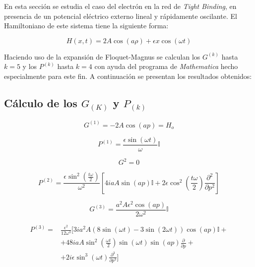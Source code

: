 En esta sección se estudia el caso del electrón en la red de \textit{Tight Binding}, en presencia de un potencial eléctrico externo lineal y rápidamente oscilante. El Hamiltoniano de este sistema tiene la siguiente forma:

\begin{equation}\label{eq:10.10}
    H(x,t)=2A\cos(a\rho)+\epsilon x \cos(\omega t)
\end{equation}

Haciendo uso de la expansión de Floquet-Magnus se calculan los $G^{(k)}$ hasta $k=5$ y los $P^{(k)}$ hasta $k=4$ con ayuda del programa de \textit{Mathematica} hecho especialmente para este fin. A continuación se presentan los resultados obtenidos:

\subsection{Cálculo de los $G_{(K)}$ y $P_{(k)}$}

\begin{equation}\label{eq:10.11}
    G^{(1)}=-2A\cos(ap)=H_o
\end{equation}

\begin{equation}\label{eq:10.12}
    P^{(1)}=\frac{\epsilon\sin(\omega t)}{\omega}\mathbb{I}
\end{equation}

\begin{equation}\label{eq:10.13}
    G^{2}=0
\end{equation}

\begin{equation}\label{eq:10.14}
    P^{(2)}=\frac{\epsilon\sin^2(\frac{t\omega}{2})}{\omega^2}[4iaA\sin(ap)\mathbb{I}+2\epsilon\cos^2(\frac{t\omega}{2})\frac{\partial^2}{\partial p^2}]
\end{equation}

\begin{equation}\label{eq:10.15}
    G^{(3)}=\frac{a^2A\epsilon^2\cos(ap)}{2\omega^2}\mathbb{I}
\end{equation}

\begin{equation}\label{eq:10.16}
         \begin{split}         P^{(3)}=&\frac{\epsilon^2}{12\omega^3}[3ia^2A(8\sin(\omega t)-3\sin(2\omega t))\cos(ap)\mathbb{I} +\\&+48iaA\sin^2(\frac{\omega t}{2})\sin(\omega t)\sin(ap)\frac{\partial}{\partial p}+\\&+ 2i\epsilon\sin^3(\omega t)\frac{\partial^3}{\partial p^3}]
    \end{split}
\end{equation}

